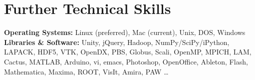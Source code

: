 \documentclass[11pt]{seilercv}
\begin{document}
\section{Further Technical Skills }
{%
{{ \textbf{Operating Systems:} \hspace{.34in} Linux (preferred), Mac (current), Unix, DOS, Windows }} \vspace{0.07cm} \\
{{ \textbf{Libraries \& Software:} \hspace{.22in} Unity, jQuery, Hadoop, NumPy/SciPy/iPython, LAPACK, HDF5, VTK, OpenDX, PBS, Globus, Scali, OpenMP, MPICH, LAM, Cactus, MATLAB, Arduino, vi, emacs, Photoshop, OpenOffice, Ableton, Flash, Mathematica, Maxima, ROOT, VisIt, Amira, PAW \ldots}} }
\end{document}
